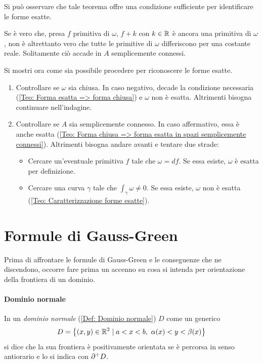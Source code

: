 \begin{oss}
    Si può osservare che tale teorema offre una condizione sufficiente per identificare le forme esatte.
\end{oss}
\begin{oss}
    Se è vero che, presa $f$ primitiva di $\omega$, $f+k$ con $k \in \mathbb{R}$ è ancora una primitiva di $\omega$, non è altrettanto vero che tutte le primitive di $\omega$ differiscono per una costante reale. Solitamente ciò accade in $A$ semplicemente connessi.
\end{oss}
\begin{example}
    Si mostri ora come sia possibile procedere per riconoscere le forme esatte.
\begin{enumerate}
    \item Controllare se $\omega$ sia chiusa. In caso negativo, decade la condizione necessaria (\ref{Teo: Forma esatta => forma chiusa}) e $\omega$ non è esatta. Altrimenti bisogna continuare nell'indagine.
    \item Controllare se $A$ sia semplicemente connesso. In caso affermativo, essa è anche esatta (\ref{Teo: Forma chiusa => forma esatta in spazi semplicemente connessi}). Altrimenti bisogna andare avanti e tentare due strade:
    \begin{itemize}
        \item Cercare un'eventuale primitiva $f$ tale che $\omega= df$. Se essa esiste, $\omega$ è esatta per definizione.
        \item Cercare una curva $\gamma$ tale che $\int_{\gamma}{\omega} \neq 0$. Se essa esiste, $\omega$ non è esatta (\ref{Teo: Caratterizzazione forme esatte}). 
    \end{itemize}
\end{enumerate}
\end{example}
\section{Formule di Gauss-Green}
Prima di affrontare le formule di Gauss-Green e le conseguenze che ne discendono, occorre fare prima un accenno su cosa si intenda per orientazione della frontiera di un dominio.
\paragraph{Dominio normale}
In un \textit{dominio normale} (\ref{Def: Dominio normale}) $D$ come un generico
 \begin{equation*}
 D=\left\{ (x,y) \in \mathbb{R}^2 \mid a<x<b,\ \alpha(x)<y<\beta(x)\right\}
 \end{equation*}
 si dice che la sua frontiera è positivamente orientata se è percorsa in senso antiorario e lo si indica con $\partial^+ D$.
